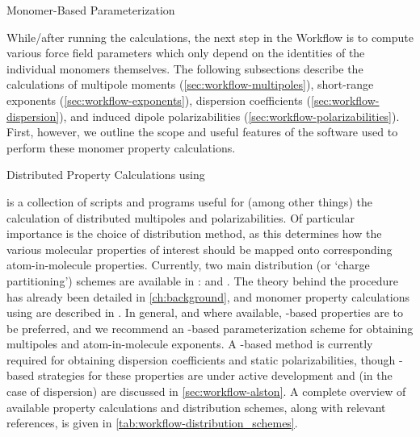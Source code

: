 \begin{section}{Monomer-Based Parameterization}
\label{sec:workflow-monomer_parameters}

While/after running the \dftsapt calculations, the next step in the Workflow
is to compute various force field parameters which only depend on the
identities of the individual monomers themselves. The following subsections describe the
calculations of multipole moments (\cref{sec:workflow-multipoles}),
short-range exponents (\cref{sec:workflow-exponents}), dispersion coefficients
(\cref{sec:workflow-dispersion}), and induced dipole polarizabilities
(\cref{sec:workflow-polarizabilities}). First, however, we 
outline the scope and useful features of the \camcasp software used to
perform these monomer property calculations.

\begin{subsection}{Distributed Property Calculations using \camcasp}

\camcasp is a collection of scripts and programs useful for (among other
things) the calculation of distributed multipoles and
polarizabilities.\cite{camcasp5.8} Of particular importance is the
choice of distribution method, as this determines how the various molecular properties
of interest should be mapped onto corresponding atom-in-molecule properties. Currently, two
main distribution (or `charge partitioning') schemes are available in \camcasp:
\dma\cite{Stone2005} and
\isa.\cite{Misquitta2014} The theory behind the \isa procedure has already been detailed in
\cref{ch:background}, and monomer property calculations using \dma are
described in 
. In general, and where
available, \isa-based properties are to be preferred, and we recommend an
\isa-based parameterization scheme for obtaining multipoles and
atom-in-molecule exponents. A \dma-based method is currently required for
obtaining dispersion coefficients and static polarizabilities, though
\isa-based strategies for these properties are under active development and
(in the case of dispersion) are discussed in \cref{sec:workflow-alston}.
A complete overview of
available property calculations and distribution schemes, along with relevant references,
is given in \cref{tab:workflow-distribution_schemes}.



\end{subsection}
\end{section}

